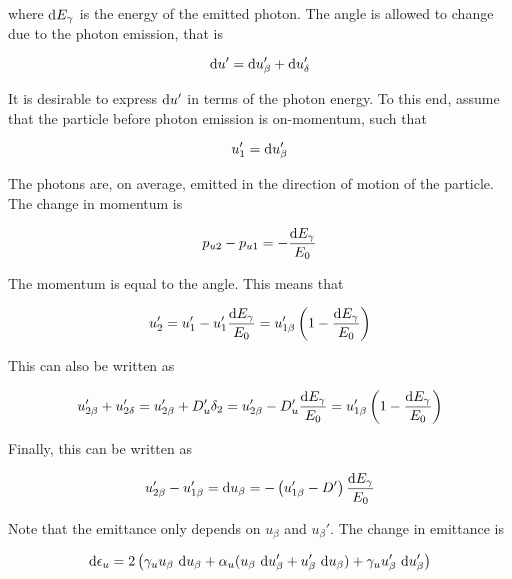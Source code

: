 where $\text{d} E_\gamma$ is the energy of the emitted photon. The angle is allowed to change due to the photon emission, that is

\begin{equation}
    \text{d} u' = \text{d} u_\beta' + \text{d} u_\delta'
\end{equation}

It is desirable to express $\text{d} u'$ in terms of the photon energy. To this end, assume that the particle before photon emission is on-momentum, such that

\begin{equation}
    u_1' = \text{d} u_\beta'
\end{equation}

The photons are, on average, emitted in the direction of motion of the particle. The change in momentum is

\begin{equation}
    p_{u2} - p_{u1} = - \frac{\text{d} E_\gamma}{E_0}
\end{equation}

The momentum is equal to the angle. This means that

\begin{equation}
    u_2' = u_1' - u_1' \frac{\text{d} E_\gamma}{E_0} = u_{1 \beta}' \left( 1 - \frac{\text{d} E_\gamma}{E_0} \right)
\end{equation}

This can also be written as

\begin{equation}
    u_{2 \beta}' + u_{2 \delta}' = u_{2 \beta}' + D_u' \delta_2 = u_{2 \beta}' - D_u' \frac{\text{d} E_\gamma}{E_0} = u_{1 \beta}' \left( 1 - \frac{\text{d} E_\gamma}{E_0} \right)
\end{equation}

Finally, this can be written as

\begin{equation}
    u_{2\beta}' - u_{1\beta}' = \text{d} u_\beta = - \left( u_{1\beta}' - D' \right) \frac{\text{d} E_\gamma}{E_0}
    \label{eq:deeubetaprime}
\end{equation}

Note that the emittance only depends on $u_\beta$ and $u_\beta'$. The change in emittance is

\begin{equation}
    \dee \epsilon_u = 2 \left( \gamma_u u_\beta\ \dee u_\beta + \alpha_u (u_\beta\ \dee u_\beta' + u_\beta'\ \dee u_\beta) + \gamma_u u_\beta'\ \dee u_\beta' \right)
\end{equation}

